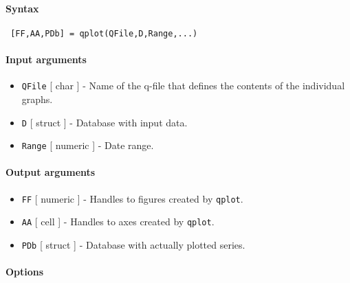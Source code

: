 


	\paragraph{Syntax}
 
 \begin{verbatim}
 [FF,AA,PDb] = qplot(QFile,D,Range,...)
 \end{verbatim}
 
 \paragraph{Input arguments}
 
 \begin{itemize}
 \item
   \texttt{QFile} {[} char {]} - Name of the q-file that defines the
   contents of the individual graphs.
 \item
   \texttt{D} {[} struct {]} - Database with input data.
 \item
   \texttt{Range} {[} numeric {]} - Date range.
 \end{itemize}
 
 \paragraph{Output arguments}
 
 \begin{itemize}
 \item
   \texttt{FF} {[} numeric {]} - Handles to figures created by
   \texttt{qplot}.
 \item
   \texttt{AA} {[} cell {]} - Handles to axes created by \texttt{qplot}.
 \item
   \texttt{PDb} {[} struct {]} - Database with actually plotted series.
 \end{itemize}
 
 \paragraph{Options}
 
